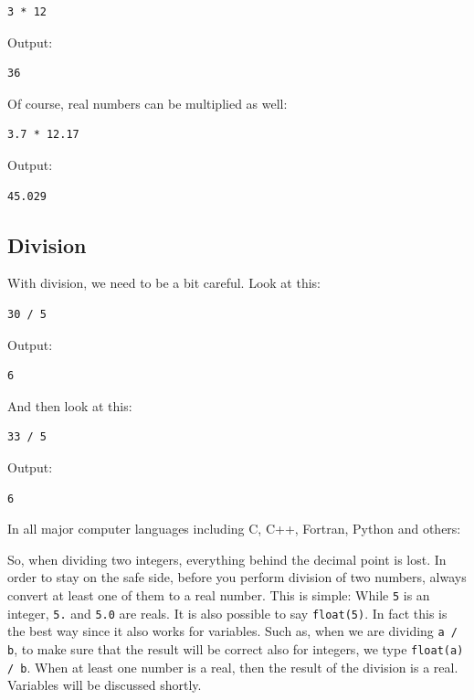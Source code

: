 \begin{verbatim}
3 * 12
\end{verbatim}
Output:

\begin{verbatim}
36
\end{verbatim}
Of course, real numbers can be multiplied as well:

\begin{verbatim}
3.7 * 12.17
\end{verbatim}
Output:

\begin{verbatim}
45.029
\end{verbatim}
\subsection{Division}
With division, we need to be a bit careful. Look at this:

\begin{verbatim}
30 / 5
\end{verbatim}
Output:

\begin{verbatim}
6
\end{verbatim}
And then look at this:

\begin{verbatim}
33 / 5
\end{verbatim}
Output:

\begin{verbatim}
6
\end{verbatim}
In all major computer languages including C, C++, Fortran, Python and 
others:\\

\begin{center}
\end{center}

\vspace{4mm}
\noindent
So, when dividing two integers, everything behind the decimal point is lost.
In order to stay on the safe side, 
before you perform division of two numbers, always convert at least one of them
to a real number. This is simple: While {\tt 5} is an integer, {\tt 5.}
and {\tt 5.0} are reals. It is also possible to 
say {\tt float(5)}. In fact this is the best way since it also works for 
variables. Such as, when we are dividing {\tt a / b}, to make sure that 
the result will be correct also for integers, we type {\tt float(a) / b}. 
When at least one number is a real, then the result of the division is a real.   
Variables will be discussed shortly.

